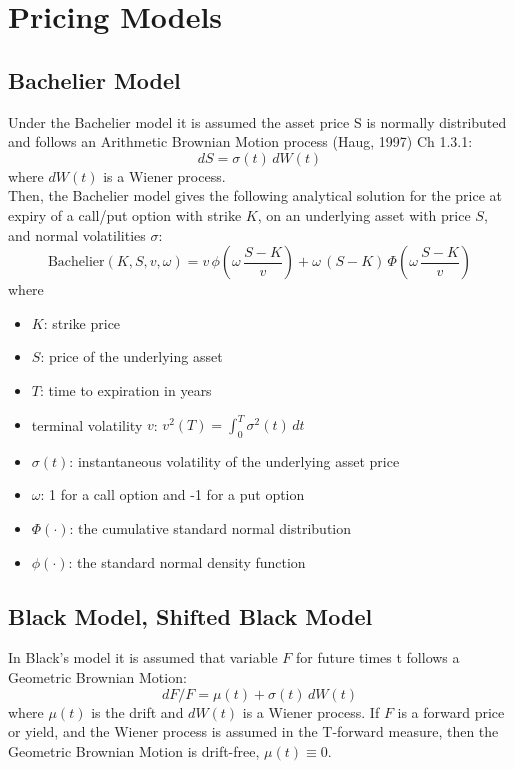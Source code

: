 \section{Pricing Models}
\label{sec:models}

\subsection{Bachelier Model}
\label{models:bachelier}

Under the Bachelier model it is assumed the asset price S is normally distributed
and follows an Arithmetic Brownian Motion process (Haug, 1997) Ch 1.3.1:
$$
dS=\sigma(t)\,dW(t)
$$
where $dW(t)$ is a Wiener process. \\

Then, the Bachelier model gives the following analytical solution for the price
at expiry of a call/put option with strike $K$, on an underlying asset with price $S$,
and normal volatilities $\sigma$:
$$
\mbox{Bachelier}(K,S,v,\omega)=v\, \phi\left(\omega\,\frac{S-K}{v}\right)
+\omega\, (S-K) \,\Phi\left(\omega\,\frac{S-K}{v}\right)
$$
where
\begin{itemize}
\item $K$: strike price
\item $S$: price of the underlying asset
\item $T$: time to expiration in years
\item  terminal volatility $v$: $\displaystyle v^2(T)=\int_0^T\sigma^2(t)\,dt$
\item $\sigma(t)$: instantaneous volatility of the underlying asset price
\item $\omega$: 1 for a call option and -1 for a put option
\item $\Phi(\cdot)$: the cumulative standard normal distribution
\item $\phi(\cdot)$: the standard normal density function
\end{itemize}

\subsection{Black Model, Shifted Black Model}
\label{models:black}

In Black's model it is assumed that variable $F$ for future times t follows a Geometric
Brownian Motion:
$$
dF/F=\mu(t)+\sigma(t)\,dW(t)
$$
where $\mu(t)$ is the drift and $dW(t)$ is a Wiener process. If $F$ is a forward price
or yield, and the Wiener process is assumed in the T-forward measure, then the Geometric
Brownian Motion is drift-free, $\mu(t)\equiv 0$.

